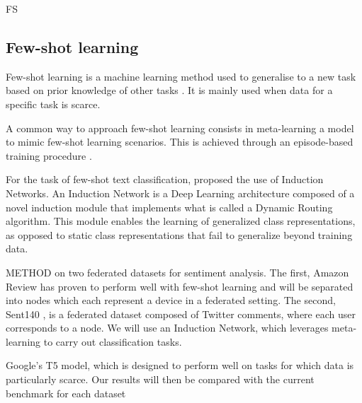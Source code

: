 


FS
\subsection{Few-shot learning}
            Few-shot learning is a machine learning method used to generalise to a new task based on prior knowledge of other tasks \cite{wang2020generalizing}. It is mainly used when data for a specific task is scarce.
            
            A common way to approach few-shot learning consists in meta-learning a model to mimic few-shot learning scenarios. This is achieved through an episode-based training procedure \cite{NIPS2016_90e13578}. 
            
            For the task of few-shot text classification, \cite{geng2019induction} proposed the use of Induction Networks. An Induction Network is a Deep Learning architecture composed of a novel induction module that implements what is called a Dynamic Routing algorithm. This module enables the learning of generalized class representations, as opposed to static class representations that fail to generalize beyond training data.
            



METHOD
on two federated datasets for sentiment analysis. The first, Amazon Review \cite{yu2018diverse} has proven to perform well with few-shot learning and will be separated into nodes which each represent a device in a federated setting. The second, Sent140 \cite{caldas2019leaf}, is a federated dataset composed of Twitter comments, where each user corresponds to a node. We will use an Induction Network, which leverages meta-learning to carry out classification tasks.

Google's T5 model, which is designed to perform well on tasks for which data is particularly scarce. Our results will then be compared with the current benchmark for each dataset \textcolor{green}{\textbf{\cite{Bench1}}} \textcolor{green}{\textbf{\cite{Bench2}}}


